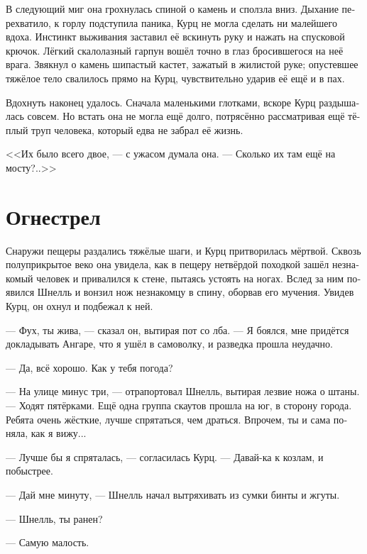 \documentclass[a4paper,10pt,fleqn]{book}\usepackage{polyglossia}\setdefaultlanguage[babelshorthands=true]{russian}\setotherlanguage{english}\defaultfontfeatures{Ligatures=TeX,Mapping=tex-text}\usepackage{xcolor}\newcommand{\ml}[3]{#2}
\begin{document}
В следующий миг она грохнулась спиной о камень и сползла вниз.
Дыхание перехватило, к горлу подступила паника, Курц не могла сделать ни малейшего вдоха.
Инстинкт выживания заставил её вскинуть руку и нажать на спусковой крючок.
Лёгкий скалолазный гарпун вошёл точно в глаз бросившегося на неё врага.
Звякнул о камень шипастый кастет, зажатый в жилистой руке;
опустевшее тяжёлое тело свалилось прямо на Курц, чувствительно ударив её ещё и в пах.

Вдохнуть наконец удалось.
Сначала маленькими глотками, вскоре Курц раздышалась совсем.
Но встать она не могла ещё долго, потрясённо рассматривая ещё тёплый труп человека, который едва не забрал её жизнь.

<<Их было всего двое, --- с ужасом думала она.
--- Сколько их там ещё на мосту?..>>

\section{Огнестрел}

Снаружи пещеры раздались тяжёлые шаги, и Курц притворилась мёртвой.
Сквозь полуприкрытое веко она увидела, как в пещеру нетвёрдой походкой зашёл незнакомый человек и привалился к стене, пытаясь устоять на ногах.
Вслед за ним появился Шнелль и вонзил нож незнакомцу в спину, оборвав его мучения.
Увидев Курц, он охнул и подбежал к ней.

--- Фух, ты жива, --- сказал он, вытирая пот со лба.
--- Я боялся, мне придётся докладывать Ангаре, что я ушёл в самоволку, и разведка прошла неудачно.

--- Да, всё хорошо.
\ml{$0$}
{Как у тебя погода?}
{What's the weather like out there?''}

\ml{$0$}
{--- На улице минус три, --- отрапортовал Шнелль, вытирая лезвие ножа о штаны.}
{``Minus three degrees Kampfbereit,'' Schnell reported, wiping knife blade with his trousers.}
--- Ходят пятёрками.
Ещё одна группа скаутов прошла на юг, в сторону города.
\ml{$0$}
{Ребята очень жёсткие, лучше спрятаться, чем драться.}
{Tough guys, it's better hide than fight.}
\ml{$0$}
{Впрочем, ты и сама поняла, как я вижу...}
{However, you already got it, I see ....''}

--- Лучше бы я спряталась, --- согласилась Курц.
--- Давай-ка к козлам, и побыстрее.

--- Дай мне минуту, --- Шнелль начал вытряхивать из сумки бинты и жгуты.

--- Шнелль, ты ранен?

--- Самую малость.
\end{document}
